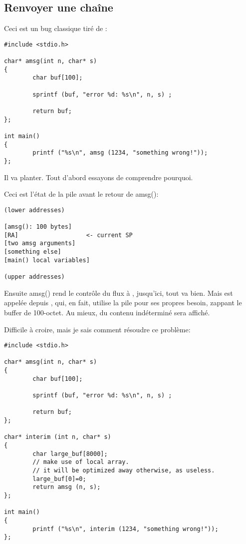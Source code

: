 \subsection{Renvoyer une chaîne}

Ceci est un bug classique tiré de \RobPikePractice{}:

\begin{lstlisting}[style=customc]
#include <stdio.h>

char* amsg(int n, char* s)
{
        char buf[100];

        sprintf (buf, "error %d: %s\n", n, s) ;

        return buf;
};

int main()
{
        printf ("%s\n", amsg (1234, "something wrong!"));
};
\end{lstlisting}

Il va planter.
Tout d'abord essayons de comprendre pourquoi.

Ceci est l'état de la pile avant le retour de amsg():

\begin{lstlisting}
(lower addresses)

[amsg(): 100 bytes]
[RA]                   <- current SP
[two amsg arguments]
[something else]
[main() local variables]

(upper addresses)
\end{lstlisting}

Ensuite amsg() rend le contrôle du flux à \main, jusqu'ici, tout va bien.
Mais \printf est appelée depuis \main, qui, en fait, utilise la pile pour ses propres
besoin, zappant le buffer de 100-octet.
Au mieux, du contenu indéterminé sera affiché.

Difficile à croire, mais je sais comment résoudre ce problème:

\begin{lstlisting}[style=customc]
#include <stdio.h>

char* amsg(int n, char* s)
{
        char buf[100];

        sprintf (buf, "error %d: %s\n", n, s) ;

        return buf;
};

char* interim (int n, char* s)
{
        char large_buf[8000];
        // make use of local array.
        // it will be optimized away otherwise, as useless.
        large_buf[0]=0;
        return amsg (n, s);
};

int main()
{
        printf ("%s\n", interim (1234, "something wrong!"));
};
\end{lstlisting}

